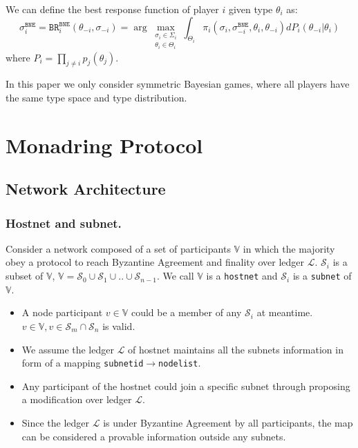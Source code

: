 \documentclass[11pt]{article}
\begin{document}
We can define the best response function of player $i$ given type $\theta_i$ as:
\begin{equation}
\sigma^\texttt{BNE}_i=\texttt{BR}^\texttt{BNE}_i(\theta_{-i},\sigma_{-i}) = \arg\max_{\substack{\sigma_i \in \Sigma_i \\ \theta_i\in \Theta_i}} \int_{\Theta_i} \pi_i(\sigma_i,\sigma^\texttt{BNE}_{-i},\theta_i,\theta_{-i})dP_i(\theta_{-i}|\theta_i)
\end{equation}
where $P_i=\prod_{j\neq i}p_j(\theta_j)$.

In this paper we only consider symmetric Bayesian games, where all players have the same type space and type distribution.

\section{Monadring Protocol}
\subsection{Network Architecture}
\subsubsection{Hostnet and subnet.}
Consider a network composed of a set of participants $\mathbb{V}$ in which the majority obey a protocol to reach Byzantine Agreement and finality\cite{grandpa} over ledger $\mathcal{L}$.
$\mathcal{S}_{i}$ is a subset of $\mathbb{V}$, \( \mathbb{V} = \mathcal{S}_{0} \cup \mathcal{S}_{1} \cup .. \cup \mathcal{S}_{n-1}  \).
We call $\mathbb{V}$ is a \texttt{hostnet} and $\mathcal{S}_{i}$ is a \texttt{subnet} of $\mathbb{V}$.
\begin{itemize}
\item A node participant \( v \in \mathbb{V} \) could be a member of any $\mathcal{S}_{i}$ at meantime.\( v \in \mathbb{V}, v \in \mathcal{S}_{m} \cap \mathcal{S}_{n} \) is valid.
\item We assume the ledger $\mathcal{L}$ of hostnet maintains all the subnets information in form of a mapping \texttt{subnetid}\( \rightarrow \)\texttt{nodelist}.
\item Any participant of the hostnet could join a specific subnet through proposing a modification over ledger $\mathcal{L}$.
\item Since the ledger $\mathcal{L}$ is under Byzantine Agreement by all participants, the map can be considered a provable information outside any subnets.
\end{itemize}
\end{document}
